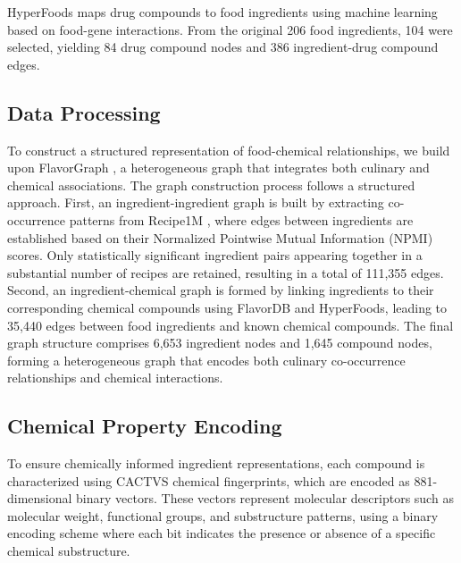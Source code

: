{HyperFoods} maps drug compounds to food ingredients using machine learning based on food-gene interactions. From the original {206 food ingredients}, {104 were selected}, yielding {84 drug compound nodes} and {386 ingredient-drug compound edges}.

\subsection{Data Processing}

To construct a structured representation of food-chemical relationships, we build upon {FlavorGraph} \cite{Park2019}, a heterogeneous graph that integrates both culinary and chemical associations. The graph construction process follows a structured approach. First, an ingredient-ingredient graph is built by extracting co-occurrence patterns from Recipe1M \cite{Marin2019}, where edges between ingredients are established based on their {Normalized Pointwise Mutual Information (NPMI)} scores. Only statistically significant ingredient pairs appearing together in a substantial number of recipes are retained, resulting in a total of {111,355 edges}. Second, an ingredient-chemical graph is formed by linking ingredients to their corresponding chemical compounds using FlavorDB and HyperFoods, leading to {35,440 edges} between food ingredients and known chemical compounds. The final graph structure comprises {6,653 ingredient nodes} and {1,645 compound nodes}, forming a {heterogeneous graph} that encodes both culinary co-occurrence relationships and chemical interactions.

\subsection{Chemical Property Encoding}
To ensure chemically informed ingredient representations, each compound is characterized using {CACTVS chemical fingerprints}, which are encoded as {881-dimensional binary vectors}. These vectors represent molecular descriptors such as molecular weight, functional groups, and substructure patterns, using a {binary encoding scheme} where each bit indicates the presence or absence of a specific chemical substructure.


